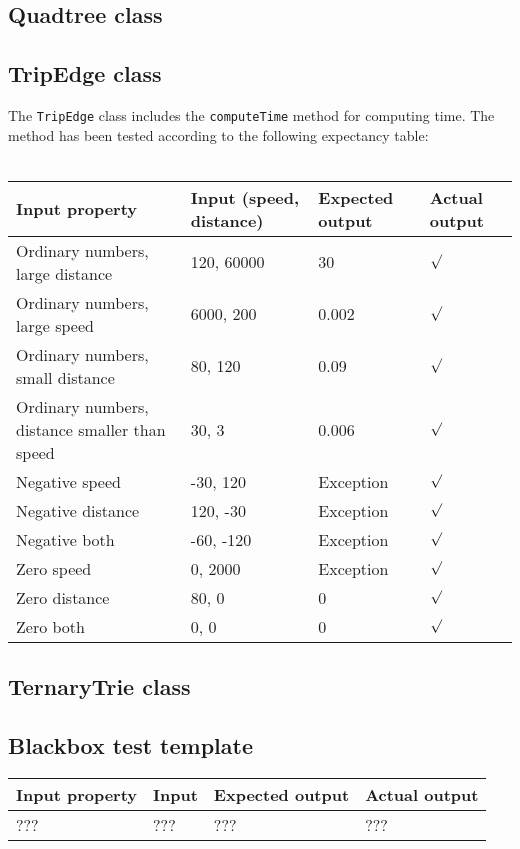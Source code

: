 \documentclass[a4paper,11pt]{article}
\begin{document}
\pagebreak
\subsection{Quadtree class}


\pagebreak
\subsection{TripEdge class}
The \texttt{TripEdge} class includes the \texttt{computeTime} method for computing time. The method has been tested according to the following expectancy table: \\ \\
\begin{tabular}{ p{3.5cm} | p{2.5cm} | p{2.5cm} | p{2.5cm} }
	Input property & Input (speed, distance) & Expected output & Actual output \\
	\hline
	Ordinary numbers, large distance & 120, 60000 & 30 & $\surd$ \\
	Ordinary numbers, large speed & 6000, 200 & 0.002 & $\surd$ \\
	Ordinary numbers, small distance & 80, 120 & 0.09 & $\surd$ \\
	Ordinary numbers, distance smaller than speed & 30, 3 & 0.006 & $\surd$ \\
	Negative speed & -30, 120 & Exception & $\surd$ \\
	Negative distance & 120, -30 & Exception & $\surd$ \\
	Negative both & -60, -120 & Exception & $\surd$ \\
	Zero speed & 0, 2000 & Exception & $\surd$ \\
	Zero distance & 80, 0 & 0 & $\surd$ \\
	Zero both & 0, 0 & 0 & $\surd$
\end{tabular}

\pagebreak
\subsection{TernaryTrie class}

\pagebreak
\subsection{Blackbox test template}
\begin{tabular}{ p{3.5cm} | p{2.5cm} | p{2.5cm} | p{2.5cm} }
	Input property & Input & Expected output & Actual output \\
	\hline
	??? & ??? & ??? & ???
\end{tabular}
\end{document}
